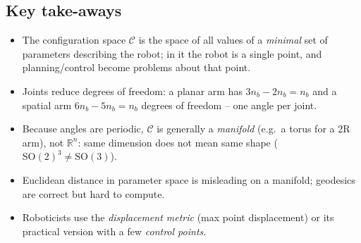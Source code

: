 \documentclass[11pt,a4paper]{article}
\newcommand{\R}{\mathbb{R}}
\newcommand{\C}{\mathcal{C}}
\newcommand{\SO}{\mathrm{SO}}
\theoremstyle{definition}
\theoremstyle{plain}
\begin{document}
\subsection{Key take-aways}

\begin{itemize}
  \item The configuration space $\C$ is the space of all values of a \emph{minimal} set of parameters describing the robot; in it the robot is a single point, and planning/control become problems about that point.
  \item Joints reduce degrees of freedom: a planar arm has $3n_b-2n_b=n_b$ and a spatial arm $6n_b-5n_b=n_b$ degrees of freedom -- one angle per joint.
  \item Because angles are periodic, $\C$ is generally a \emph{manifold} (e.g.\ a torus for a 2R arm), not $\R^n$: same dimension does not mean same shape ($\SO(2)^3\ne\SO(3)$).
  \item Euclidean distance in parameter space is misleading on a manifold; geodesics are correct but hard to compute.
  \item Roboticists use the \emph{displacement metric} (max point displacement) or its practical version with a few \emph{control points}.
\end{itemize}
\end{document}
